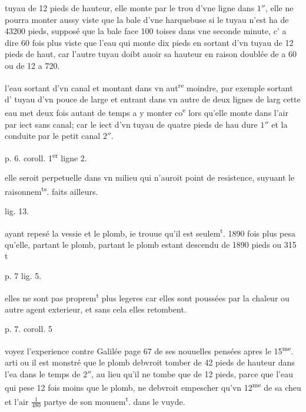 \documentclass[11pt,a4paper]{article}
\begin{document}

tuyau de 12 pieds de hauteur, elle monte par le trou d'vne ligne dans $1''$, elle ne pourra monter aussy viste que la bale d'vne harquebuse si le tuyau n'est ha de 43200 pieds, supposé que la bale face 100 toises dans vne seconde minute, c' a dire 60 fois plus viste que l'eau qui monte dix pieds en sortant d'vn tuyau de 12 pieds de haut, car l'autre tuyau doibt auoir sa hauteur en raison doublée de \ill{} a 60 ou de 12 a  720.

l'eau sortant d'vn canal et montant dans vn aut\textsuperscript{re} moindre, par exemple sortant d' tuyau d'vn pouce de large et entrant dans vn autre de deux lignes de larg cette eau met deux fois autant de temps a y monter co\textsuperscript{e} lors qu'elle monte dans l'air par iect sans canal; car le iect d'vn tuyau de quatre pieds de hau dure $1''$ et la conduite par le petit canal $2''$.

p. 6. coroll. 1\textsuperscript{er} ligne 2.

elle seroit perpetuelle dans vn milieu qui n'auroit point de resistence, suyuant le raisonnem\textsuperscript{ts}. faits ailleurs.

lig. 13.

ayant repesé la vessie et le plomb, ie trouue qu'il est seulem\textsuperscript{t}. 1890 fois plus pesa qu'elle, partant le plomb, partant le plomb estant descendu de 1890 pieds ou 315 t\ill{}

p. 7 lig. 5.

elles ne sont pas proprem\textsuperscript{t} plus legeres car elles sont poussées par la chaleur ou autre agent exterieur, et sans cela elles retombent.

p. 7. coroll. 5

voyez l'experience contre Galilée page 67 de ses nouuelles pensées apres le 15\textsuperscript{me}. arti ou il est monstré que le plomb debvroit tomber de 42 pieds de hauteur dans l'ea dans le temps de $2''$, au lieu qu'il ne tombe que de 12 pieds, parce que l'eau qui pese 12 fois moins que le plomb, ne debvroit empescher qu'vn 12\textsuperscript{me} de sa cheu et l'air $\frac{1}{480}$ partye de son mouuem\textsuperscript{t}. dans le vuyde.
\end{document}
